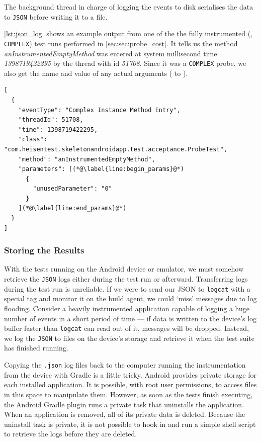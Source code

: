 The background thread in charge of logging the events to disk serialises the
data to {\tt JSON} before writing it to a file.

\autoref{lst:json_log} shows an example output from one of the the fully
instrumented (\ie, {\tt COMPLEX}) test runs performed in
\autoref{sec:sec:probe_cost}. It tells us the method
\textit{anInstrumentedEmptyMethod} was entered at system millisecond time
\textit{1398719422295} by the thread with id \textit{51708}. Since it was a
{\tt COMPLEX} probe, we also get the name and value of any actual arguments
( to ).

\begin{lstlisting}[label=lst:json_log]
[
  {
    "eventType": "Complex Instance Method Entry",
    "threadId": 51708,
    "time": 1398719422295,
    "class": "com.heisentest.skeletonandroidapp.test.acceptance.ProbeTest",
    "method": "anInstrumentedEmptyMethod",
    "parameters": [(*@\label{line:begin_params}@*)
      {
        "unusedParameter": "0"
      }
    ](*@\label{line:end_params}@*)
  }
]
\end{lstlisting}

\subsubsection{Storing the Results}

With the tests running on the Android device or emulator, we must somehow
retrieve the {\tt JSON} logs either during the test run or afterward.
Transferring logs during the test run is unreliable. If we were to send our JSON
to {\tt logcat} with a special tag and monitor it on the build agent, we could
{\lq}miss{\rq} messages due to log flooding. Consider a heavily instrumented
application capable of logging a huge number of events in a short period of time
--- if data is written to the device's log buffer faster than {\tt logcat} can
read out of it, messages will be dropped. Instead, we log the {\tt JSON} to
files on the device's storage and retrieve it when the test suite has finished
running.

Copying the {\tt .json} log files back to the computer running the
instrumentation from the device with Gradle is a little tricky. Android provides
private storage for each installed application. It is possible, with root user
permissions, to access files in this space to manipulate them. However, as soon
as the tests finish executing, the Android Gradle plugin runs a private task
that uninstalls the application. When an application is removed, all of its
private data is deleted. Because the uninstall task is private, it is not
possible to hook in and run a simple shell script to retrieve the logs before
they are deleted.

